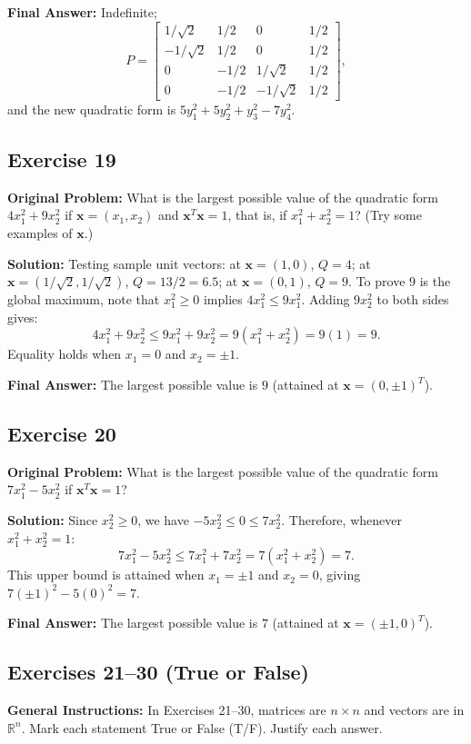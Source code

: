 \documentclass[11pt, letterpaper]{article}
\theoremstyle{definition}
\theoremstyle{remark}
\begin{document}
\textbf{Final Answer:} Indefinite;
\[
P = \begin{bmatrix}
1/\sqrt{2} & 1/2 & 0 & 1/2 \\
-1/\sqrt{2} & 1/2 & 0 & 1/2 \\
0 & -1/2 & 1/\sqrt{2} & 1/2 \\
0 & -1/2 & -1/\sqrt{2} & 1/2
\end{bmatrix},
\]
and the new quadratic form is $5y_1^2 + 5y_2^2 + y_3^2 - 7y_4^2$.

\hrulefill

\subsection*{Exercise 19}
\textbf{Original Problem:} What is the largest possible value of the quadratic form $4x_1^2 + 9x_2^2$ if $\mathbf{x} = (x_1, x_2)$ and $\mathbf{x}^T \mathbf{x} = 1$, that is, if $x_1^2 + x_2^2 = 1$? (Try some examples of $\mathbf{x}$.)

\textbf{Solution:}
Testing sample unit vectors: at $\mathbf{x} = (1, 0)$, $Q = 4$; at $\mathbf{x} = (1/\sqrt{2}, 1/\sqrt{2})$, $Q = 13/2 = 6.5$; at $\mathbf{x} = (0, 1)$, $Q = 9$.
To prove $9$ is the global maximum, note that $x_1^2 \ge 0$ implies $4x_1^2 \le 9x_1^2$. Adding $9x_2^2$ to both sides gives:
\[
4x_1^2 + 9x_2^2 \le 9x_1^2 + 9x_2^2 = 9(x_1^2 + x_2^2) = 9(1) = 9.
\]
Equality holds when $x_1 = 0$ and $x_2 = \pm 1$.

\textbf{Final Answer:} The largest possible value is $9$ (attained at $\mathbf{x} = (0, \pm 1)^T$).

\hrulefill

\subsection*{Exercise 20}
\textbf{Original Problem:} What is the largest possible value of the quadratic form $7x_1^2 - 5x_2^2$ if $\mathbf{x}^T \mathbf{x} = 1$?

\textbf{Solution:}
Since $x_2^2 \ge 0$, we have $-5x_2^2 \le 0 \le 7x_2^2$. Therefore, whenever $x_1^2 + x_2^2 = 1$:
\[
7x_1^2 - 5x_2^2 \le 7x_1^2 + 7x_2^2 = 7(x_1^2 + x_2^2) = 7.
\]
This upper bound is attained when $x_1 = \pm 1$ and $x_2 = 0$, giving $7(\pm 1)^2 - 5(0)^2 = 7$.

\textbf{Final Answer:} The largest possible value is $7$ (attained at $\mathbf{x} = (\pm 1, 0)^T$).

\hrulefill

\subsection*{Exercises 21--30 (True or False)}
\textbf{General Instructions:} In Exercises 21--30, matrices are $n \times n$ and vectors are in $\mathbb{R}^n$. Mark each statement True or False (T/F). Justify each answer.
\end{document}
